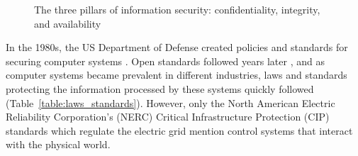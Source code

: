 \documentclass{article}
\begin{document}
\begin{figure}[h] \centering
{}
    \caption{The three pillars of information security: \gls{confidentiality, integrity, and availability}}
    \label{figure:cia}
\end{figure}

In the 1980s, the US Department of Defense created policies and standards for securing computer systems \citep{department_of_defense_csc-std-001-83_1983}. Open standards followed years later \citep{holbrook_rfc_1991}, and as computer systems became prevalent in different industries, laws and standards protecting the information processed by these systems quickly followed (Table~\ref{table:laws_standards}). However, only the North American Electric Reliability Corporation's (NERC) Critical Infrastructure Protection (CIP) standards which regulate the electric grid mention control systems that interact with the physical world.
\end{document}
